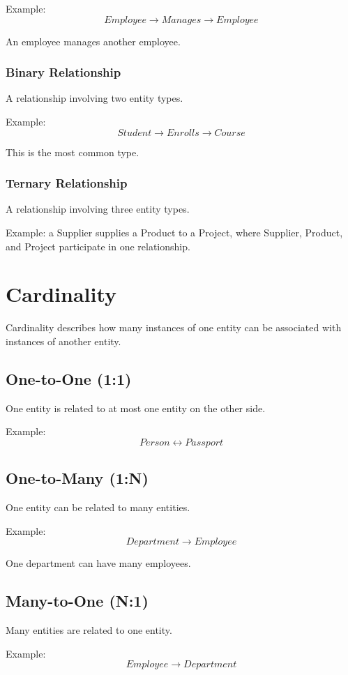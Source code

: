 \documentclass[12pt,a4paper]{article}
\begin{document}
Example:
\[
Employee \longrightarrow Manages \longrightarrow Employee
\]

An employee manages another employee.

\subsubsection{Binary Relationship}
A relationship involving two entity types.

Example:
\[
Student \longrightarrow Enrolls \longrightarrow Course
\]

This is the most common type.

\subsubsection{Ternary Relationship}
A relationship involving three entity types.

Example: a Supplier supplies a Product to a Project, where Supplier, Product, and Project participate in one relationship.

\section{Cardinality}

Cardinality describes how many instances of one entity can be associated with instances of another entity.

\subsection{One-to-One (1:1)}
One entity is related to at most one entity on the other side.

Example:
\[
Person \longleftrightarrow Passport
\]

\subsection{One-to-Many (1:N)}
One entity can be related to many entities.

Example:
\[
Department \longrightarrow Employee
\]

One department can have many employees.

\subsection{Many-to-One (N:1)}
Many entities are related to one entity.

Example:
\[
Employee \longrightarrow Department
\]
\end{document}
